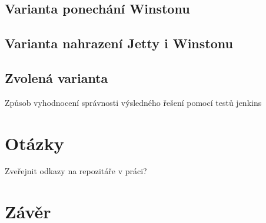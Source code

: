         
    \section{Varianta ponechání Winstonu}

    \section{Varianta nahrazení Jetty i Winstonu}

    \section{Zvolená varianta}
        Způsob vyhodnocení správnosti výsledného řešení pomocí testů jenkins


\chapter{Otázky}
    Zveřejnit odkazy na repozitáře v práci?

\chapter{Závěr}





